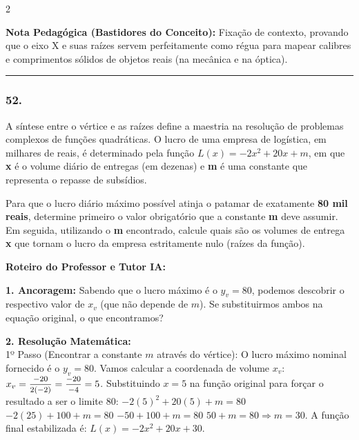 \begin{multicols*}{2}
    \begin{boxexplicacao}
    \textbf{Nota Pedagógica (Bastidores do Conceito):} Fixação de contexto, provando que o eixo X e suas raízes servem perfeitamente como régua para mapear calibres e comprimentos sólidos de objetos reais (na mecânica e na óptica).
    \end{boxexplicacao}
\fi

\par\vspace{\espacoQuestao}

\noindent\textcolor{CorLinha}{\rule{\linewidth}{0.5pt}} 
\par\vspace{\espacoPreQuestao}
\subsubsection*{52.} 
\begin{enunciadoLiteral}
A síntese entre o vértice e as raízes define a maestria na resolução de problemas complexos de funções quadráticas. O lucro de uma empresa de logística, em milhares de reais, é determinado pela função $L(x) = -2x^2 + 20x + m$, em que \textbf{x} é o volume diário de entregas (em dezenas) e \textbf{m} é uma constante que representa o repasse de subsídios.

Para que o lucro diário máximo possível atinja o patamar de exatamente \textbf{80 mil reais}, determine primeiro o valor obrigatório que a constante \textbf{m} deve assumir. Em seguida, utilizando o \textbf{m} encontrado, calcule quais são os volumes de entrega \textbf{x} que tornam o lucro da empresa estritamente nulo (raízes da função).
\end{enunciadoLiteral}

\ifgabarito
    \begin{tcolorbox}[colback=CorTitUm!5, colframe=CorTitUm, boxrule=1pt, arc=4pt, left=6pt, right=6pt, top=6pt, bottom=6pt]
    \small\textbf{\textcolor{CorTitUm}{Roteiro do Professor e Tutor IA:}}\par\vspace{0.1cm}
    \color{CinzaEscuro}
    \textbf{1. Ancoragem:} Sabendo que o lucro máximo é o $y_v=80$, podemos descobrir o respectivo valor de $x_v$ (que não depende de $m$). Se substituirmos ambos na equação original, o que encontramos?\par\vspace{0.1cm}
    \textbf{2. Resolução Matemática:}\\
    1º Passo (Encontrar a constante $m$ através do vértice): 
    O lucro máximo nominal fornecido é o $y_v = 80$.
    Vamos calcular a coordenada de volume $x_v$:
    $x_v = \mfrac{-20}{2(-2)} = \mfrac{-20}{-4} = 5$.
    Substituindo $x=5$ na função original para forçar o resultado a ser o limite 80:
    $-2(5)^2 + 20(5) + m = 80$
    $-2(25) + 100 + m = 80$
    $-50 + 100 + m = 80$
    $50 + m = 80 \Rightarrow m = 30$.
    A função final estabilizada é: $L(x) = -2x^2 + 20x + 30$.
    

\end{tcolorbox}
\end{multicols*}
